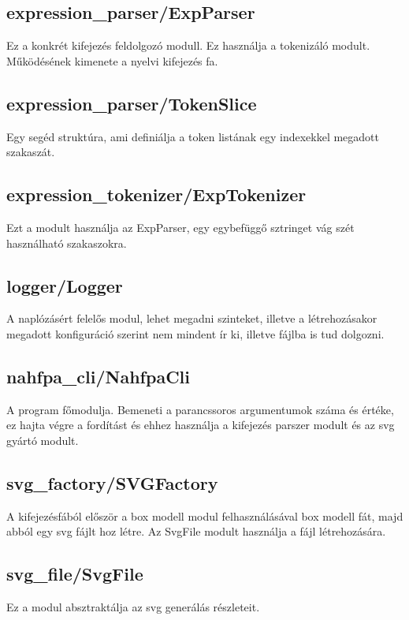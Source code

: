 \documentclass{article}[12pt,a4paper]
\begin{document}
    \subsection{expression\_parser/ExpParser}
    Ez a konkrét kifejezés feldolgozó modull.
    Ez használja a tokenizáló modult.
    Működésének kimenete a nyelvi kifejezés fa.
    
    \subsection{expression\_parser/TokenSlice}
    Egy segéd struktúra, ami definiálja a token listának egy indexekkel megadott szakaszát.
    
    \subsection{expression\_tokenizer/ExpTokenizer}
    Ezt a modult használja az ExpParser, egy egybefüggő sztringet vág szét használható szakaszokra.

    \subsection{logger/Logger}
    A naplózásért felelős modul, lehet megadni szinteket, illetve a létrehozásakor megadott konfiguráció szerint nem mindent ír ki, illetve fájlba is tud dolgozni.

    \subsection{nahfpa\_cli/NahfpaCli}
    A program főmodulja.
    Bemeneti a parancssoros argumentumok száma és értéke, ez hajta végre a fordítást és ehhez használja a kifejezés parszer modult és az svg gyártó modult.

    \subsection{svg\_factory/SVGFactory}
    A kifejezésfából először a box modell modul felhasználásával box modell fát, majd abból egy svg fájlt hoz létre.
    Az SvgFile modult használja a fájl létrehozására.

    \subsection{svg\_file/SvgFile}
    Ez a modul absztraktálja az svg generálás részleteit.
\end{document}
